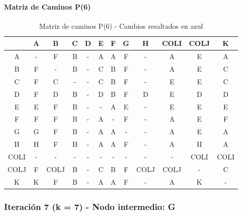 \documentclass[12pt]{article}
\begin{document}
\paragraph{Matriz de Caminos P(6)}
\begin{table}[h!]
\centering
\begin{tabular}{|c|c|c|c|c|c|c|c|c|c|c|c|}
\hline
 & A & B & C & D & E & F & G & H & COLI & COLJ & K \\\hline
A & - & \cellcolor{lightblue} F & \cellcolor{lightblue} B & - & A & A & \cellcolor{lightblue} F & - & A & E & A \\\hline
B & \cellcolor{lightblue} F & - & B & - & C & B & \cellcolor{lightblue} F & - & \cellcolor{lightblue} A & E & C \\\hline
C & \cellcolor{lightblue} F & C & - & - & C & B & \cellcolor{lightblue} F & - & E & E & C \\\hline
D & \cellcolor{lightblue} F & D & B & - & D & B & \cellcolor{lightblue} F & D & E & D & D \\\hline
E & E & \cellcolor{lightblue} F & \cellcolor{lightblue} B & - & - & A & E & - & E & E & E \\\hline
F & F & F & B & - & A & - & F & - & A & E & F \\\hline
G & G & \cellcolor{lightblue} F & \cellcolor{lightblue} B & - & A & A & - & - & A & E & A \\\hline
H & H & \cellcolor{lightblue} F & H & - & A & A & \cellcolor{lightblue} F & - & A & H & A \\\hline
COLI & - & - & - & - & - & - & - & - & - & COLI & COLI \\\hline
COLJ & \cellcolor{lightblue} F & COLJ & B & - & C & B & \cellcolor{lightblue} F & COLJ & COLJ & - & C \\\hline
K & K & \cellcolor{lightblue} F & \cellcolor{lightblue} B & - & A & A & \cellcolor{lightblue} F & - & A & K & - \\\hline
\end{tabular}
\caption{Matriz de caminos P(6) - Cambios resaltados en azul}
\end{table}

\subsubsection{Iteración 7 (k = 7) - Nodo intermedio: G}
\end{document}
